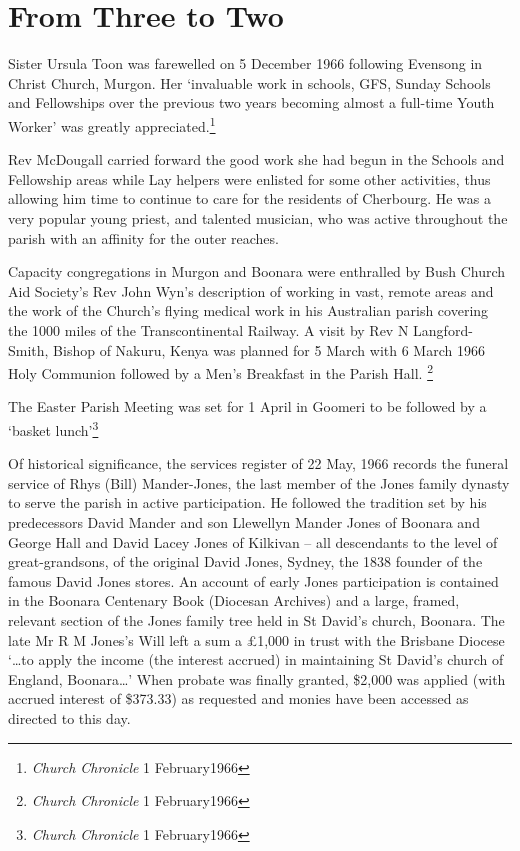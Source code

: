 \hypertarget{from-three-to-two}{%
\section{From Three to Two}\label{from-three-to-two}}

Sister Ursula Toon was farewelled on 5 December 1966 following Evensong
in Christ Church, Murgon. Her `invaluable work in schools, GFS, Sunday
Schools and Fellowships over the previous two years becoming almost a
full-time Youth Worker' was greatly appreciated.\footnote{\emph{Church
  Chronicle} 1 February1966}

Rev McDougall carried forward the good work she had begun in the Schools
and Fellowship areas while Lay helpers were enlisted for some other
activities, thus allowing him time to continue to care for the residents
of Cherbourg. He was a very popular young priest, and talented musician,
who was active throughout the parish with an affinity for the outer
reaches.

Capacity congregations in Murgon and Boonara were enthralled by Bush
Church Aid Society's Rev John Wyn's description of working in vast,
remote areas and the work of the Church's flying medical work in his
Australian parish covering the 1000 miles of the Transcontinental
Railway. A visit by Rev N Langford-Smith, Bishop of Nakuru, Kenya was
planned for 5 March with 6 March 1966 Holy Communion followed by a Men's
Breakfast in the Parish Hall. \footnote{\emph{Church Chronicle} 1
  February1966}

The Easter Parish Meeting was set for 1 April in Goomeri to be followed
by a `basket lunch'\footnote{\emph{Church Chronicle} 1 February1966}

Of historical significance, the services register of 22 May, 1966
records the funeral service of Rhys (Bill) Mander-Jones, the last member
of the Jones family dynasty to serve the parish in active participation.
He followed the tradition set by his predecessors David Mander and son
Llewellyn Mander Jones of Boonara and George Hall and David Lacey Jones
of Kilkivan -- all descendants to the level of great-grandsons, of the
original David Jones, Sydney, the 1838 founder of the famous David Jones
stores. An account of early Jones participation is contained in the
Boonara Centenary Book (Diocesan Archives) and a large, framed, relevant
section of the Jones family tree held in St David's church, Boonara. The
late Mr R M Jones's Will left a sum a £1,000 in trust with the Brisbane
Diocese `\ldots to apply the income (the interest accrued) in
maintaining St David's church of England, Boonara\ldots' When probate
was finally granted, \$2,000 was applied (with accrued interest of
\$373.33) as requested and monies have been accessed as directed to this
day.

